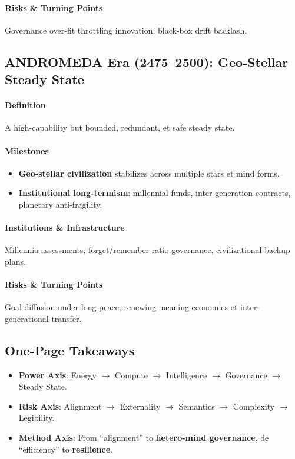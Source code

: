 \documentclass[11pt]{article}
\begin{document}
\paragraph{Risks \& Turning Points} Governance over-fit throttling innovation; black-box drift backlash.

\subsection{ANDROMEDA Era (2475–2500): Geo-Stellar Steady State}
\paragraph{Definition} A high-capability but bounded, redundant, et safe steady state.

\paragraph{Milestones}
\begin{itemize}[noitemsep]
  \item \textbf{Geo-stellar civilization} stabilizes across multiple stars et mind forms.
  \item \textbf{Institutional long-termism}: millennial funds, inter-generation contracts, planetary anti-fragility.
\end{itemize}

\paragraph{Institutions \& Infrastructure} Millennia assessments, forget/remember ratio governance, civilizational backup plans.

\paragraph{Risks \& Turning Points} Goal diffusion under long peace; renewing meaning economies et inter-generational transfer.

\subsection{One-Page Takeaways}
\begin{itemize}[noitemsep]
  \item \textbf{Power Axis}: Energy $\rightarrow$ Compute $\rightarrow$ Intelligence $\rightarrow$ Governance $\rightarrow$ Steady State.
  \item \textbf{Risk Axis}: Alignment $\rightarrow$ Externality $\rightarrow$ Semantics $\rightarrow$ Complexity $\rightarrow$ Legibility.
  \item \textbf{Method Axis}: From ``alignment'' to \textbf{hetero-mind governance}, de ``efficiency'' to \textbf{resilience}.
\end{itemize}
\end{document}
